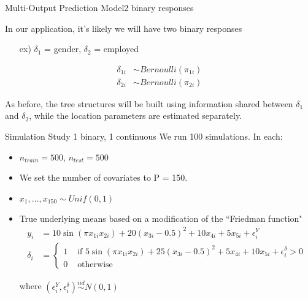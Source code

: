 \documentclass{beamer}
\begin{document}
\begin{frame}{Multi-Output Prediction Model}{2 binary responses}

In our application, it's likely we will have two binary responses
\begin{itemize}
\item[ex)] $\delta_1$ = gender, $\delta_2$ = employed
\end{itemize}


\begin{align}
\delta_{1i} &\sim Bernoulli(\pi_{1i}) \\
\delta_{2i} &\sim Bernoulli(\pi_{2i})
\end{align}

As before, the tree structures will be built using information shared between $\delta_1$ and $\delta_2$, while the location parameters are estimated separately. 

\end{frame}


\begin{frame}{Simulation Study }{1 binary, 1 continuous}
We run 100 simulations. In each:
\begin{itemize}
\item $n_{train} = 500$, $n_{test} = 500$
\item We set the number of covariates to P = 150. 
\item $x_1, \hdots, x_{150} \sim Unif(0,1)$
\item True underlying means based on a modification of the ``Friedman function"
\begin{align*}
y_i &= 10 \sin (\pi x_{1i} x_{2i}) + 20(x_{3i} - 0.5)^2 + 10x_{4i} + 5x_{5i} +
\epsilon_i^Y\\
\delta_i &= \begin{cases}1 &\text{ if }5 \sin (\pi x_{1i} x_{2i}) + 25(x_{3i} - 0.5)^2 + 5x_{4i} + 10x_{5i} +
\epsilon_i^{\delta} > 0 \\
                          0 & \text{ otherwise}\end{cases}
\end{align*}

where $(\epsilon_i^Y, \epsilon_i^{\delta}) \overset{iid}{\sim} N(0,1)$

\end{itemize}



\end{frame}
\end{document}
